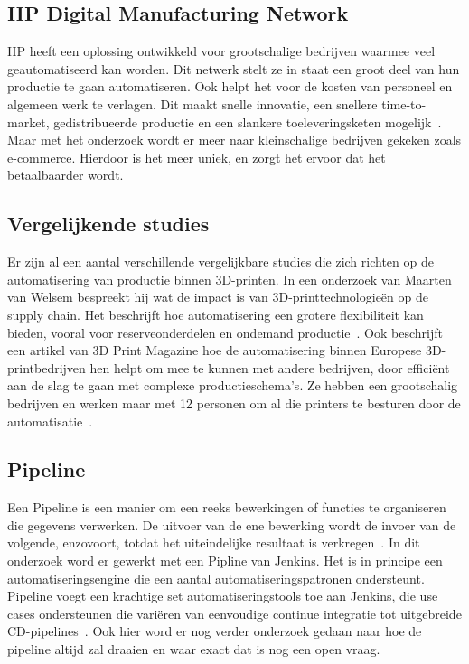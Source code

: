 \subsection{HP Digital Manufacturing Network}%

HP heeft een oplossing ontwikkeld voor grootschalige bedrijven waarmee veel geautomatiseerd kan worden. Dit netwerk stelt ze in staat een groot deel van hun productie te gaan automatiseren. Ook helpt het voor de kosten van personeel en algemeen werk te verlagen. Dit maakt snelle innovatie, een snellere time-to-market, gedistribueerde productie en een slankere toeleveringsketen mogelijk~\autocite{hp3DprintingNetwork }. Maar met het onderzoek wordt er meer naar kleinschalige bedrijven gekeken zoals e-commerce. Hierdoor is het meer uniek, en zorgt het ervoor dat het betaalbaarder wordt.



\subsection{Vergelijkende studies}%

Er zijn al een aantal verschillende vergelijkbare studies die zich richten op de automatisering van productie binnen 3D-printen. In een onderzoek van Maarten van Welsem bespreekt hij wat de impact is van 3D-printtechnologieën op de supply chain. Het beschrijft hoe automatisering een grotere flexibiliteit kan bieden, vooral voor reserveonderdelen en ondemand productie~\autocite{emerce3DprintSupplyChain}. Ook beschrijft een artikel van 3D Print Magazine hoe de automatisering binnen Europese 3D-printbedrijven hen helpt om mee te kunnen met andere bedrijven, door efficiënt aan de slag te gaan met complexe productieschema's. Ze hebben een grootschalig bedrijven en werken maar met 12 personen om al die printers te besturen door de automatisatie~\autocite{3dprintmagAutomation}. 


\subsection{Pipeline}%

Een Pipeline is een manier om een ​​reeks bewerkingen of functies te organiseren die gegevens verwerken. De uitvoer van de ene bewerking wordt de invoer van de volgende, enzovoort, totdat het uiteindelijke resultaat is verkregen~\autocite{pythonPipelinesThakur}. In dit onderzoek word er gewerkt met een Pipline van Jenkins. Het is in principe een automatiseringsengine die een aantal automatiseringspatronen ondersteunt. Pipeline voegt een krachtige set automatiseringstools toe aan Jenkins, die use cases ondersteunen die variëren van eenvoudige continue integratie tot uitgebreide CD-pipelines~\autocite{jenkinsPipeline}. Ook hier word er nog verder onderzoek gedaan naar hoe de pipeline altijd zal draaien en waar exact dat is nog een open vraag.


